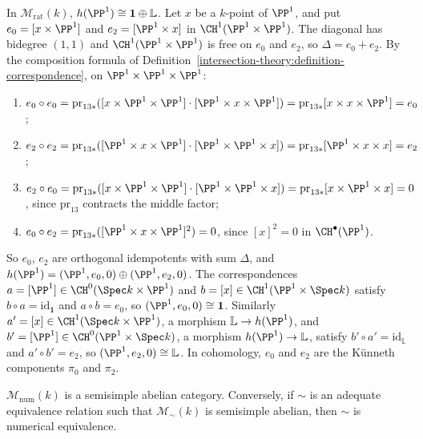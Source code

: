 \begin{example}\label{absolute-hodge:example-projective-line}
In $\mathcal{M}_{\mathrm{rat}}(k)$, $h(\PP^1) \cong \mathbf{1} \oplus \mathbb{L}$. Let $x$ be a $k$-point of $\PP^1$, and put $e_0 = [x \times \PP^1]$ and $e_2 = [\PP^1 \times x]$ in $\CH^1(\PP^1 \times \PP^1)$. The diagonal has
bidegree $(1,1)$ and $\CH^1(\PP^1 \times \PP^1)$ is free on $e_0$ and $e_2$, so $\Delta = e_0 + e_2$. By the composition formula of Definition~\ref{intersection-theory:definition-correspondence}, on
$\PP^1 \times \PP^1 \times \PP^1$:
\begin{enumerate}
\item $e_0 \circ e_0 = \mathrm{pr}_{13*}([x \times \PP^1 \times \PP^1] \cdot [\PP^1 \times x \times \PP^1]) = \mathrm{pr}_{13*}[x \times x \times \PP^1] = e_0$;
\item $e_2 \circ e_2 = \mathrm{pr}_{13*}([\PP^1 \times x \times \PP^1] \cdot [\PP^1 \times \PP^1 \times x]) = \mathrm{pr}_{13*}[\PP^1 \times x \times x] = e_2$;
\item $e_2 \circ e_0 = \mathrm{pr}_{13*}([x \times \PP^1 \times \PP^1] \cdot [\PP^1 \times \PP^1 \times x]) = \mathrm{pr}_{13*}[x \times \PP^1 \times x] = 0$, since $\mathrm{pr}_{13}$ contracts the middle factor;
\item $e_0 \circ e_2 = \mathrm{pr}_{13*}([\PP^1 \times x \times \PP^1]^2) = 0$, since $[x]^2 = 0$ in $\CH^\bullet(\PP^1)$.
\end{enumerate}
So $e_0$, $e_2$ are orthogonal idempotents with sum $\Delta$, and $h(\PP^1) = (\PP^1, e_0, 0) \oplus (\PP^1, e_2, 0)$. The correspondences $a = [\PP^1] \in \CH^0(\Spec k \times \PP^1)$ and $b = [x] \in \CH^1(\PP^1 \times \Spec k)$
satisfy $b \circ a = \mathrm{id}_{\mathbf{1}}$ and $a \circ b = e_0$, so $(\PP^1, e_0, 0) \cong \mathbf{1}$. Similarly $a' = [x] \in \CH^1(\Spec k \times \PP^1)$, a morphism $\mathbb{L} \to h(\PP^1)$, and $b' = [\PP^1] \in \CH^0(\PP^1 \times \Spec k)$,
a morphism $h(\PP^1) \to \mathbb{L}$, satisfy $b' \circ a' = \mathrm{id}_{\mathbb{L}}$ and $a' \circ b' = e_2$, so $(\PP^1, e_2, 0) \cong \mathbb{L}$. In cohomology, $e_0$ and $e_2$ are the K\"unneth components $\pi_0$ and $\pi_2$.
\end{example}

\begin{theorem}[Jannsen]\label{absolute-hodge:theorem-jannsen}
$\mathcal{M}_{\mathrm{num}}(k)$ is a semisimple abelian category. Conversely, if $\sim$ is an adequate equivalence relation such that $\mathcal{M}_\sim(k)$ is semisimple abelian, then $\sim$ is numerical
equivalence.
\end{theorem}

